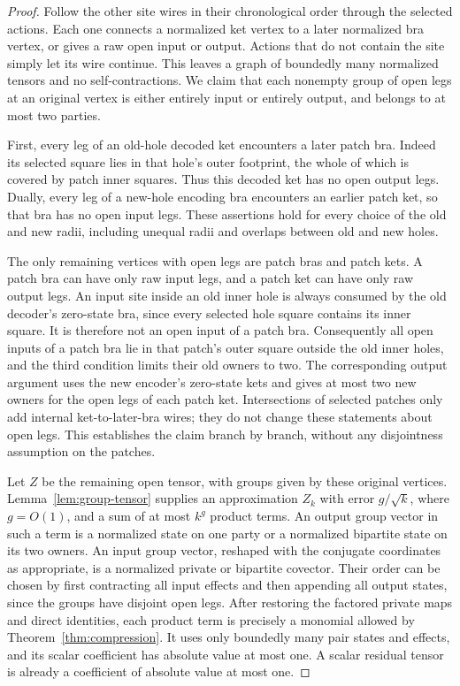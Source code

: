 \documentclass[11pt]{article}
\numberwithin{equation}{section}
\theoremstyle{definition}
\theoremstyle{remark}
\begin{document}
\begin{proof}
Follow the other site wires in their chronological order through the
selected actions.  Each one connects a normalized ket vertex to a later
normalized bra vertex, or gives a raw open input or output.  Actions that
do not contain the site simply let its wire continue.  This leaves a graph
of boundedly many normalized tensors and no self-contractions.  We claim
that each nonempty group of open legs at an original vertex is either
entirely input or entirely output, and belongs to at most two parties.

First, every leg of an old-hole decoded ket encounters a later patch bra.
Indeed its selected square lies in that hole's outer footprint, the whole
of which is covered by patch inner squares.  Thus this decoded ket has no
open output legs.  Dually, every leg of a new-hole encoding bra encounters
an earlier patch ket, so that bra has no open input legs.  These assertions
hold for every choice of the old and new radii, including unequal radii
and overlaps between old and new holes.

The only remaining vertices with open legs are patch bras and patch kets.
A patch bra can have only raw input legs, and a patch ket can have only raw
output legs.  An input site inside an old inner hole is always consumed by
the old decoder's zero-state bra, since every selected hole square contains
its inner square.  It is therefore not an open input of a patch bra.
Consequently all open inputs of a patch bra lie in that patch's outer
square outside the old inner holes, and the third condition limits their
old owners to two.  The corresponding output argument uses the new
encoder's zero-state kets and gives at most two new owners for the open
legs of each patch ket.  Intersections of selected patches only add
internal ket-to-later-bra wires; they do not change these statements about
open legs.  This establishes the claim branch by branch, without any
disjointness assumption on the patches.

Let $Z$ be the remaining open tensor, with groups given by these original
vertices.  Lemma~\ref{lem:group-tensor} supplies an approximation $Z_k$ with
error $g/\sqrt{k}$, where $g=O(1)$, and a sum of at most $k^g$ product terms.
An output group vector in such a term is a normalized state on one party
or a normalized bipartite state on its two owners.  An input group vector,
reshaped with the conjugate coordinates as appropriate, is a normalized
private or bipartite covector.  Their order can be chosen by first
contracting all input effects and then appending all output states, since
the groups have disjoint open legs.  After restoring the factored private
maps and direct identities, each product term is precisely a monomial
allowed by Theorem~\ref{thm:compression}.  It uses only boundedly many pair
states and effects, and its scalar coefficient has absolute value at
most one.  A scalar residual tensor is already a coefficient of absolute
value at most one.


\end{proof}
\end{document}
